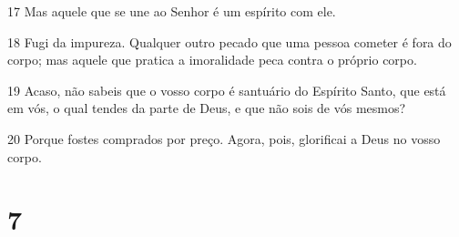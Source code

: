 \par 17 Mas aquele que se une ao Senhor é um espírito com ele.
\par 18 Fugi da impureza. Qualquer outro pecado que uma pessoa cometer é fora do corpo; mas aquele que pratica a imoralidade peca contra o próprio corpo.
\par 19 Acaso, não sabeis que o vosso corpo é santuário do Espírito Santo, que está em vós, o qual tendes da parte de Deus, e que não sois de vós mesmos?
\par 20 Porque fostes comprados por preço. Agora, pois, glorificai a Deus no vosso corpo.

\chapter{7}

